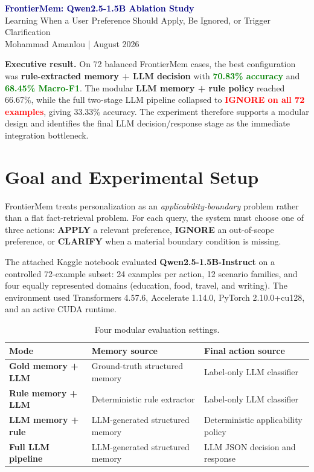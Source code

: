 \documentclass[10pt]{article}
\newcommand{\best}[1]{\textbf{\textcolor{green}{#1}}}
\newcommand{\bad}[1]{\textbf{\textcolor{red}{#1}}}
\begin{document}
\begin{center}
{\LARGE\bfseries\textcolor{navy}{FrontierMem: Qwen2.5-1.5B Ablation Study}}\\[4pt]
{\large Learning When a User Preference Should Apply, Be Ignored, or Trigger Clarification}\\[8pt]
{\small Mohammad Amanlou \quad |  August 2026}
\end{center}

\vspace{3pt}
\begin{tcolorbox}[colback=lightblue,colframe=blue,boxrule=0.8pt,arc=2mm,left=3mm,right=3mm,top=2mm,bottom=2mm]
\textbf{Executive result.} On 72 balanced FrontierMem cases, the best configuration was \textbf{rule-extracted memory + LLM decision} with \best{70.83\% accuracy} and \best{68.45\% Macro-F1}. The modular \textbf{LLM memory + rule policy} reached 66.67\%, while the full two-stage LLM pipeline collapsed to \bad{IGNORE on all 72 examples}, giving 33.33\% accuracy. The experiment therefore supports a modular design and identifies the final LLM decision/response stage as the immediate integration bottleneck.
\end{tcolorbox}

\section{Goal and Experimental Setup}
FrontierMem treats personalization as an \textit{applicability-boundary} problem rather than a flat fact-retrieval problem. For each query, the system must choose one of three actions:
\textbf{APPLY} a relevant preference, \textbf{IGNORE} an out-of-scope preference, or \textbf{CLARIFY} when a material boundary condition is missing.

The attached Kaggle notebook evaluated \textbf{Qwen2.5-1.5B-Instruct} on a controlled 72-example subset: 24 examples per action, 12 scenario families, and four equally represented domains (education, food, travel, and writing). The environment used Transformers 4.57.6, Accelerate 1.14.0, PyTorch 2.10.0+cu128, and an active CUDA runtime.

\begin{table}[H]
\centering
\small
\caption{Four modular evaluation settings.}
\begin{tabularx}{\textwidth}{>{\bfseries}p{} X X}
\toprule
Mode & Memory source & Final action source \\
\midrule
Gold memory + LLM & Ground-truth structured memory & Label-only LLM classifier \\
Rule memory + LLM & Deterministic rule extractor & Label-only LLM classifier \\
LLM memory + rule & LLM-generated structured memory & Deterministic applicability policy \\
Full LLM pipeline & LLM-generated structured memory & LLM JSON decision and response \\
\bottomrule
\end{tabularx}
\end{table}
\end{document}
